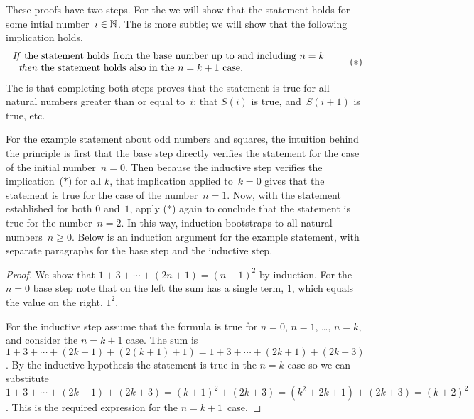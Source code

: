 \documentclass{test}  %
\begin{document}
These proofs have two steps.
For the  
we will show that the statement holds for some intial number~$i\in\mathbb{N}$.
The  is more subtle;
we will show that the following implication holds.
\begin{equation*}
  \begin{tabular}{l} 
  \textit{If} the statement holds from the
   base number up to and including $n=k$  \\
  \hspace*{0.618em}\textit{then} the statement holds also in the~$n=k+1$ case.
  \end{tabular}
  \tag{$*$}
\end{equation*}
The  is that
completing both steps proves 
that the statement is true for all natural
numbers greater than or equal to~$i$: 
that $S(i)$ is true, and~$S(i+1)$ is true, etc.

For the example statement about odd numbers and squares, 
the intuition behind the principle is first that the base step
directly verifies the statement for the case of the initial number~$n=0$.
Then because the inductive step verifies the implication~($*$) for all $k$, 
that implication applied to~$k=0$ gives 
that the statement is true for the case of the number~$n=1$. 
Now, with the statement established for both $0$ and~$1$, 
apply ($*$) again to conclude that the statement is true for the number~$n=2$.
In this way, induction bootstraps to all natural numbers~$n\geq 0$.
Below is an induction argument for the example statement, 
with separate paragraphs for the base step and the inductive step.

\begin{proof}
  We show that $1+3+\cdots+(2n+1)=(n+1)^2$ by induction.
  For the $n=0$ base step note that on the left the sum has a single term, $1$,
  which equals the value on the right, $1^2$.

  For the inductive step assume that the 
  formula is true for $n=0$, $n=1$, \ldots, $n=k$, and 
  consider the $n=k+1$ case.
  The sum is $1+3+\cdots+(2k+1)+(2(k+1)+1)=1+3+\cdots+(2k+1)+(2k+3)$.
  By the inductive hypothesis the statement is true in the $n=k$ case
  so we can substitute 
  $1+3+\cdots+(2k+1)+(2k+3)=(k+1)^2+(2k+3)=(k^2+2k+1)+(2k+3)=(k+2)^2$.
  This is the required expression for the $n=k+1$~case.
\end{proof}
\end{document}
